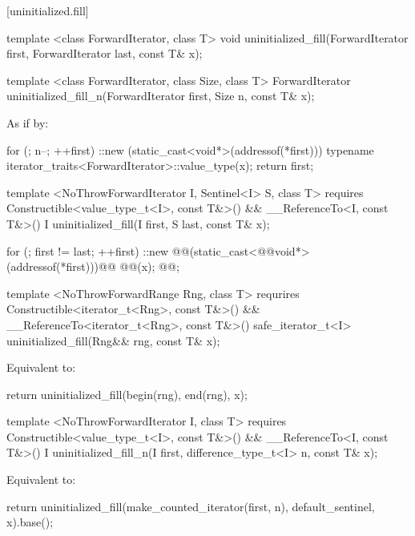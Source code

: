 [uninitialized.fill]{}
{\color{remclr}
\begin{codeblock}
template <class ForwardIterator, class T>
  void uninitialized_fill(ForwardIterator first, ForwardIterator last,
                          const T& x);
\end{codeblock}

\begin{codeblock}
template <class ForwardIterator, class Size, class T>
  ForwardIterator uninitialized_fill_n(ForwardIterator first, Size n, const T& x);
\end{codeblock}

\setcounter{Paras}{1}
\pnum
\effects As if by:
\begin{codeblock}
        for (; n--; ++first)
          ::new (static_cast<void*>(addressof(*first)))
            typename iterator_traits<ForwardIterator>::value_type(x);
        return first;
\end{codeblock}
} %

{\color{addclr}
\begin{codeblock}
template <NoThrowForwardIterator I, Sentinel<I> S, class T>
  requires Constructible<value_type_t<I>, const T&>() &&
           __ReferenceTo<I, const T&>()
  I uninitialized_fill(I first, S last, const T& x);
\end{codeblock}
} %

\setcounter{Paras}{0}
\pnum
\effects {}
\begin{codeblock}
        for (; first != last; ++first)
          ::new @@(static_cast<@@void*>(addressof(*first)))@\added{)}@
            @@(x);
        @@;
\end{codeblock}

{\color{addclr}
\begin{codeblock}
template <NoThrowForwardRange Rng, class T>
  requrires Constructible<iterator_t<Rng>, const T&>() &&
            __ReferenceTo<iterator_t<Rng>, const T&>()
  safe_iterator_t<I>
  uninitialized_fill(Rng&& rng, const T& x);
\end{codeblock}

\setcounter{Paras}{0}
\pnum
\effects Equivalent to:
\begin{codeblock}
        return uninitialized_fill(begin(rng), end(rng), x);
\end{codeblock}

\begin{codeblock}
template <NoThrowForwardIterator I, class T>
  requires Constructible<value_type_t<I>, const T&>() &&
           __ReferenceTo<I, const T&>()
  I uninitialized_fill_n(I first, difference_type_t<I> n, const T& x);
\end{codeblock}

\pnum
\effects Equivalent to:
\begin{codeblock}
        return uninitialized_fill(make_counted_iterator(first, n),
                                  default_sentinel{}, x).base();
\end{codeblock}
} %

